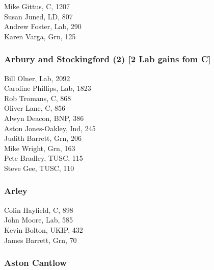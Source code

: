 \documentclass[a4paper,openany,10pt]{book}
\begin{document}


Mike Gittus, C, 1207\\
Susan Juned, LD, 807\\
Andrew Foster, Lab, 290\\
Karen Varga, Grn, 125\\


\subsubsection*{Arbury and Stockingford (2) \hspace*{\fill}\nolinebreak[1]%
\enspace\hspace*{\fill}
[2 Lab gains fom C]}



Bill Olner, Lab, 2092\\
Caroline Phillips, Lab, 1823\\
Rob Tromans, C, 868\\
Oliver Lane, C, 856\\
Alwyn Deacon, BNP, 386\\
Aston Jones-Oakley, Ind, 245\\
Judith Barrett, Grn, 206\\
Mike Wright, Grn, 163\\
Pete Bradley, TUSC, 115\\
Steve Gee, TUSC, 110\\


\subsubsection*{Arley}



Colin Hayfield, C, 898\\
John Moore, Lab, 585\\
Kevin Bolton, UKIP, 432\\
James Barrett, Grn, 70\\


\subsubsection*{Aston Cantlow}

\end{document}
